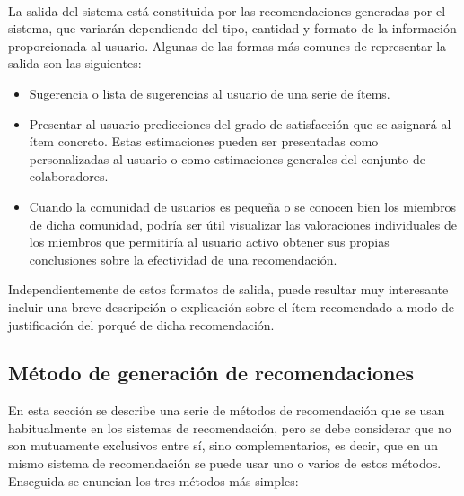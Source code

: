 \documentclass[12pt,letterpaper,oneside] {memoir}
\begin{document}
\paragraph{}
La salida del sistema está constituida por las recomendaciones generadas por el sistema, que variarán dependiendo del tipo, cantidad y formato de la información proporcionada al usuario. Algunas de las formas más comunes de representar la salida son las siguientes:

\begin{itemize}
\item Sugerencia o lista de sugerencias al usuario de una serie de ítems.
\item Presentar al usuario predicciones del grado de satisfacción que se asignará al ítem concreto. Estas estimaciones pueden ser presentadas como personalizadas al usuario o como estimaciones generales del conjunto de colaboradores.
\item Cuando la comunidad de usuarios es pequeña o se conocen bien los miembros de dicha comunidad, podría ser útil visualizar las valoraciones individuales de los miembros que permitiría al usuario activo obtener sus propias conclusiones sobre la efectividad de una recomendación.
\end{itemize}

Independientemente de estos formatos de salida, puede resultar muy interesante incluir una breve descripción o explicación sobre el ítem recomendado a modo de justificación del porqué de dicha recomendación.

\subsection{Método de generación de recomendaciones}

En esta sección se describe una serie de métodos de recomendación que se usan habitualmente en los sistemas de recomendación, pero se debe considerar que no son mutuamente exclusivos entre sí, sino complementarios, es decir, que en un mismo sistema de recomendación  se puede usar uno o varios de estos métodos. \\
Enseguida se enuncian  los tres métodos más simples:
\end{document}
